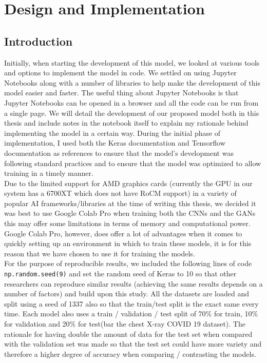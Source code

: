 \chapter{Design and Implementation}
\section{Introduction}
Initially, when starting the development of this model, we looked at various tools and options to implement the model in code.  We settled on using Jupyter Notebooks along with a number of libraries to help make the development of this model easier and faster.  The useful thing about Jupyter Notebooks is that Jupyter Notebooks can be opened in a browser and all the code can be run from a single page.  We will detail the development of our proposed model both in this thesis and include notes in the notebook itself to explain my rationale behind implementing the model in a certain way.  During the initial phase of implementation, I used both the Keras documentation \cite{keras} and Tensorflow documentation \cite{tensorflow} as references to ensure that the model's development was following standard practices and to ensure that the model was optimized to allow training in a timely manner. 
\\
Due to the limited support for AMD graphics cards (currently the GPU in our system has a 6700XT which does not have RoCM support\cite{amdLimitations}) in a variety of popular AI frameworks/libraries at the time of writing this thesis, we decided it was best to use Google Colab Pro when training both the CNNs and the GANs this may offer some limitations in terms of memory and computational power.  Google Colab Pro, however, does offer a lot of advantages when it comes to quickly setting up an environment in which to train these models, it is for this reason that we have chosen to use it for training the models.
\\
For the purpose of reproducible results, we included the following lines of code \texttt{np.random.seed(9)} and set the random seed of Keras to 10 so that other researchers can reproduce similar results (achieving the same results depends on a number of factors) and build upon this study.  All the datasets are loaded and split using a seed of 1337 also so that the train/test split is the exact same every time.  Each model also uses a train / validation / test split of 70\% for train, 10\% for validation and 20\% for test(bar the chest X-ray COVID 19 dataset).  The rationale for having double the amount of data for the test set when compared with the validation set was made so that the test set could have more variety and therefore a higher degree of accuracy when comparing / contrasting the models.
